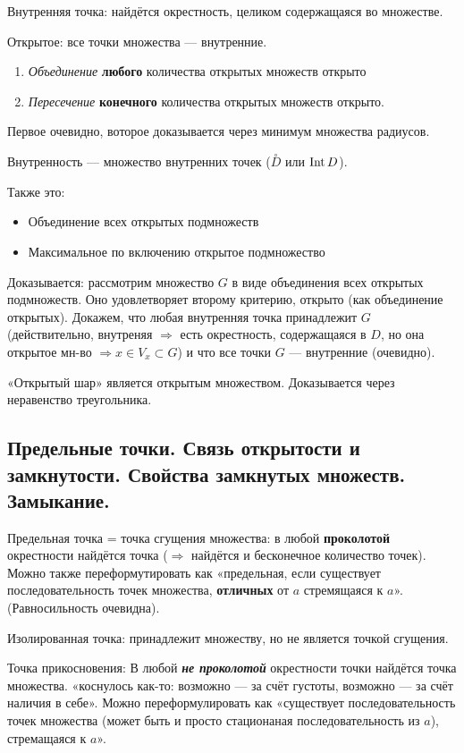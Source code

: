 \documentclass[12pt, a4paper]{article}
\begin{document}
Внутренняя точка: найдётся окрестность, целиком содержащаяся во множестве.

Открытое: все точки множества — внутренние.

\begin{enumerate}
    \item \textit{Объединение} \textbf{любого} количества открытых множеств открыто
    \item \textit{Пересечение} \textbf{конечного} количества открытых множеств открыто.
\end{enumerate}

Первое очевидно, воторое доказывается через минимум множества радиусов. 

Внутренность — множество внутренних точек ($\overset{\circ}{D}$ или $\operatorname{Int} D$).

Также это:
\begin{itemize}
    \item Объединение всех открытых подмножеств
    \item Максимальное по включению открытое подмножество
\end{itemize}

Доказывается: рассмотрим множество $G$ в виде объединения всех открытых подмножеств.
Оно удовлетворяет второму критерию, открыто (как объединение открытых).
Докажем, что любая внутренняя точка принадлежит $G$
(действительно, внутреняя $\Rightarrow$ есть окрестность, 
содержащаяся в $D$, но она открытое мн-во $\Rightarrow x \in V_{x} \subset G$) 
и что все точки $G$ — внутренние (очевидно).


«Открытый шар» является открытым множеством. Доказывается через неравенство треугольника.


\subsection{Предельные точки. Связь открытости и замкнутости. Свойства замкнутых множеств. Замыкание.}

Предельная точка = точка сгущения множества: в любой \textbf{проколотой} окрестности найдётся точка ($\Rightarrow$ найдётся и бесконечное количество точек).
Можно также переформутировать как «предельная, если существует последовательность точек множества, \textbf{отличных} от $a$ стремящаяся к $a$».
(Равносильность очевидна).

Изолированная точка: принадлежит множеству, но не является точкой сгущения.

Точка прикосновения: В любой \textit{\textbf{не проколотой}} окрестности точки найдётся точка множества.
«коснулось как-то: возможно — за счёт густоты, возможно — за счёт наличия в себе».
Можно переформулировать как «существует последовательность точек множества (может быть и просто стационаная последовательность из $a$), стремащаяся к $a$».
  
\end{document}
